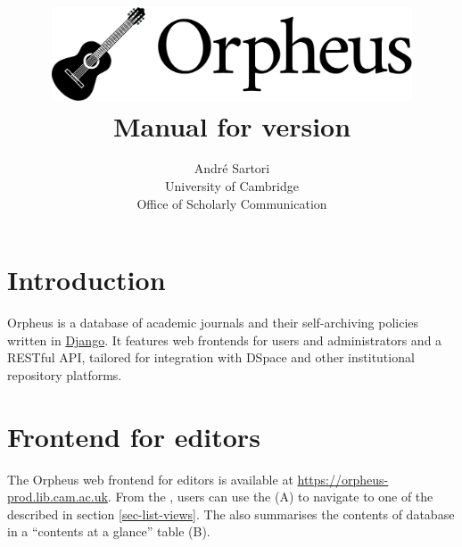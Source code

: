 \documentclass[british, 12pt]{article}
\begin{document}
\title{\includegraphics[width=0.8\textwidth]{orpheus-logo-final}\\
  \large Manual for version \orpheusversion\\[1mm]
}
\author{André Sartori\\
  \normalsize University of Cambridge\\[-1mm]
  \normalsize Office of Scholarly Communication}
\maketitle
\tableofcontents{}

\section{Introduction}

Orpheus is a database of academic journals and their self-archiving policies written in \href{https://www.djangoproject.com}{Django}. It features web frontends for users and administrators and a RESTful API, tailored for integration with DSpace and other institutional repository platforms.

\section{Frontend for editors}

The Orpheus web frontend for editors is available at \url{https://orpheus-prod.lib.cam.ac.uk}. From the , users can use the  (\figp{\ref{fig-home}}A) to navigate to one of the  described in section \vref{sec-list-views}. The  also summarises the contents of database in a ``contents at a glance'' table (\figp{\ref{fig-home}}B).
\end{document}
